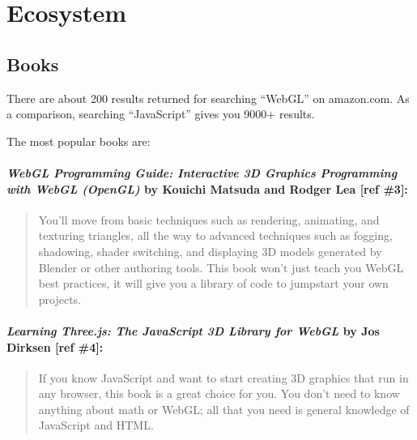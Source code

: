 \section{Ecosystem}\label{ecosystem}

\subsection{Books}\label{books}

There are about 200 results returned for searching ``WebGL'' on
amazon.com. As a comparison, searching ``JavaScript'' gives you 9000+
results.

The most popular books are:

\paragraph{\texorpdfstring{\emph{WebGL Programming Guide: Interactive 3D
Graphics Programming with WebGL (OpenGL)} by Kouichi Matsuda and Rodger
Lea {[}ref
\#3{]}:}{WebGL Programming Guide: Interactive 3D Graphics Programming with WebGL (OpenGL) by Kouichi Matsuda and Rodger Lea {[}ref \#3{]}:}}\label{webgl-programming-guide-interactive-3d-graphics-programming-with-webgl-opengl-by-kouichi-matsuda-and-rodger-lea-ref-3}

\begin{quote}
You'll move from basic techniques such as rendering, animating, and
texturing triangles, all the way to advanced techniques such as fogging,
shadowing, shader switching, and displaying 3D models generated by
Blender or other authoring tools. This book won't just teach you WebGL
best practices, it will give you a library of code to jumpstart your own
projects.
\end{quote}

\paragraph{\texorpdfstring{\emph{Learning Three.js: The JavaScript 3D
Library for WebGL} by Jos Dirksen {[}ref
\#4{]}:}{Learning Three.js: The JavaScript 3D Library for WebGL by Jos Dirksen {[}ref \#4{]}:}}\label{learning-three.js-the-javascript-3d-library-for-webgl-by-jos-dirksen-ref-4}

\begin{quote}
If you know JavaScript and want to start creating 3D graphics that run
in any browser, this book is a great choice for you. You don't need to
know anything about math or WebGL; all that you need is general
knowledge of JavaScript and HTML.
\end{quote}


